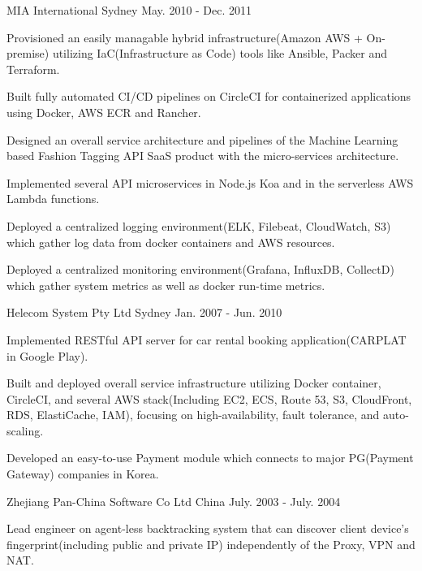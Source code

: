 \begin{cventries}
  {MIA International} %
  {Sydney} %
  {May. 2010 - Dec. 2011} %
  { \begin{cvitems} %
  \item {Provisioned an easily managable hybrid infrastructure(Amazon AWS + On-premise) utilizing IaC(Infrastructure as Code) tools like Ansible, Packer and Terraform.} \item {Built fully automated CI/CD pipelines on CircleCI for containerized applications using Docker, AWS ECR and Rancher.} \item {Designed an overall service architecture and pipelines of the Machine Learning based Fashion Tagging API SaaS product with the micro-services architecture.} \item {Implemented several API microservices in Node.js Koa and in the serverless AWS Lambda functions.} \item {Deployed a centralized logging environment(ELK, Filebeat, CloudWatch, S3) which gather log data from docker containers and AWS resources.} \item {Deployed a centralized monitoring environment(Grafana, InfluxDB, CollectD) which gather system metrics as well as docker run-time metrics.}\end{cvitems} }

  {Helecom System Pty Ltd} %
  {Sydney} %
  {Jan. 2007 - Jun. 2010} %
  { \begin{cvitems} %
  \item {Implemented RESTful API server for car rental booking application(CARPLAT in Google Play).} \item {Built and deployed overall service infrastructure utilizing Docker container, CircleCI, and several AWS stack(Including EC2, ECS, Route 53, S3, CloudFront, RDS, ElastiCache, IAM), focusing on high-availability, fault tolerance, and auto-scaling.} \item {Developed an easy-to-use Payment module which connects to major PG(Payment Gateway) companies in Korea.}\end{cvitems} }

  {Zhejiang Pan-China Software Co Ltd} %
  {China} %
  {July. 2003 - July. 2004} %
  { \begin{cvitems} %
  \item {Lead engineer on agent-less backtracking system that can discover client device's fingerprint(including public and private IP) independently of the Proxy, VPN and NAT.}\end{cvitems} }
\end{cventries}